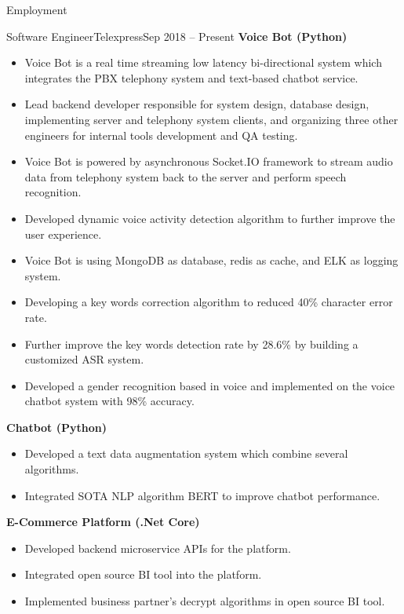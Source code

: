 \documentclass[]{mcdowellcv}
\begin{document}
	\makeheader
	
	\begin{cvsection}{Employment}
		\begin{cvsubsection}{Software Engineer}{Telexpress}{Sep 2018 -- Present}
			\textbf{Voice Bot (Python)}
			\begin{itemize}
				\item Voice Bot is a real time streaming low latency bi-directional system which integrates the PBX telephony system and text-based chatbot service.
				\item Lead backend developer responsible for system design, database design, implementing server and telephony system clients, and organizing  three other engineers for internal tools development and QA testing.
				\item Voice Bot is powered by asynchronous Socket.IO framework to stream audio data from telephony system back to the server and perform speech recognition.
				\item Developed dynamic voice activity detection algorithm to further improve the user experience.
				\item Voice Bot is using MongoDB as database, redis as cache, and ELK as logging system. 
				\item Developing a key words correction algorithm to reduced 40\% character error rate.
				\item Further improve the key words detection rate by 28.6\% by building a customized ASR system.
				\item Developed a gender recognition based in voice and implemented on the voice chatbot system with 98\% accuracy.
			\end{itemize}
			\textbf{Chatbot (Python)}
			\begin{itemize}
				\item Developed a text data augmentation system which combine several algorithms.
				\item Integrated SOTA NLP algorithm BERT to improve chatbot performance.
			\end{itemize}
			\textbf{E-Commerce Platform (.Net Core)}
			\begin{itemize}
				\item Developed backend microservice APIs for the platform.
				\item Integrated open source BI tool into the platform.
				\item Implemented business partner's decrypt algorithms in open source BI tool.

\end{itemize}
\end{cvsubsection}
\end{cvsection}
\end{document}

